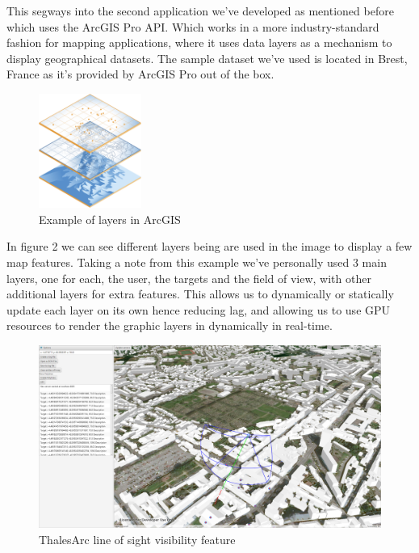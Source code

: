 \documentclass{l3proj}
\begin{document}
This segways into the second application we've developed as mentioned before which uses the ArcGIS Pro API. Which works in a more industry-standard fashion for mapping applications, where it uses data layers as a mechanism to display geographical datasets. The sample dataset we've used is located in Brest, France as it's provided by ArcGIS Pro out of the box.

\begin{figure}[!h]
    \caption{Example of layers in ArcGIS \cite{esri-layers}}
    \centering
    \includegraphics[width=0.3\textwidth ]{GISLayers.jpg}
\end{figure}

In figure 2 we can see different layers being are used in the image to display a few map features. Taking a note from this example we've personally used 3 main layers, one for each, the user, the targets and the field of view, with other additional layers for extra features. This allows us to dynamically or statically update each layer on its own hence reducing lag, and allowing us to use GPU resources to render the graphic layers in dynamically in real-time. 

\begin{figure}[H]
    \caption{ThalesArc line of sight visibility feature}
    \centering
    \includegraphics[width=\textwidth]{ArcGISLOS.jpg}
\end{figure}
\end{document}
